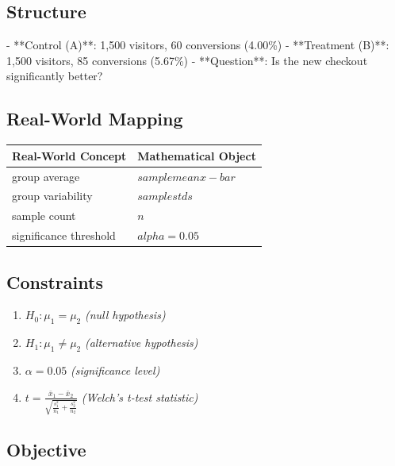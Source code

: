 \documentclass[11pt, a4paper]{article}
\begin{document}
\subsection{Structure}

- **Control (A)**: 1,500 visitors, 60 conversions (4.00\%)
- **Treatment (B)**: 1,500 visitors, 85 conversions (5.67\%)
- **Question**: Is the new checkout significantly better?

\subsection{Real-World Mapping}

\begin{longtable}{ll}
\toprule
\textbf{Real-World Concept} & \textbf{Mathematical Object} \\
\midrule
\endhead
group average & $sample mean x-bar$ \\
group variability & $sample std s$ \\
sample count & $n$ \\
significance threshold & $alpha = 0.05$ \\
\bottomrule
\end{longtable}

\subsection{Constraints}

\begin{enumerate}
  \item $H_0: \mu_1 = \mu_2$
  \hfill \textit{(null hypothesis)}
  \item $H_1: \mu_1 \neq \mu_2$
  \hfill \textit{(alternative hypothesis)}
  \item $\alpha = 0.05$
  \hfill \textit{(significance level)}
  \item $t = \frac{\bar{x}_1 - \bar{x}_2}{\sqrt{\frac{s_1^2}{n_1} + \frac{s_2^2}{n_2}}}$
  \hfill \textit{(Welch's t-test statistic)}
\end{enumerate}

\subsection{Objective}
\end{document}

